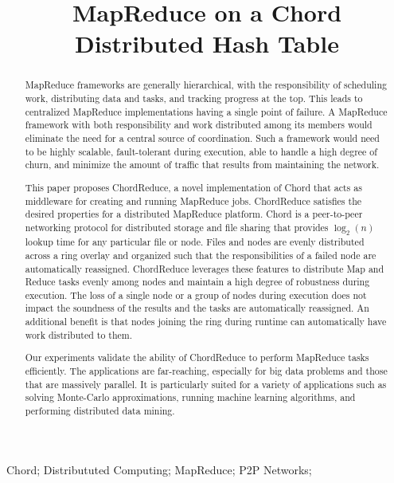 \documentclass[10pt, conference, compsocconf]{IEEEtran}
\title{MapReduce on a Chord Distributed Hash Table}
\author{\IEEEauthorblockN{Andrew Rosen \qquad Brendan Benshoof \qquad Matt Erwin \qquad Robert Harrison \qquad Anu Bourgeois}
\IEEEauthorblockA{Department of Computer Science\\
Georgia State University\\
Atlanta, Georgia\\
rosen@cs.gsu.edu}
}
\begin{document}
\maketitle

\begin{abstract}

MapReduce frameworks are generally hierarchical, with the responsibility of scheduling work, distributing data and tasks, and tracking progress at the top.  This leads to centralized MapReduce implementations having a single point of failure.  A MapReduce framework with both responsibility and work distributed among its members would eliminate the need for a central source of coordination.  Such a framework would need to be highly scalable, fault-tolerant during execution, able to handle a high degree of churn, and minimize the amount of traffic that results from maintaining the network. 

This paper proposes ChordReduce, a novel implementation of Chord that acts as middleware for creating and running MapReduce jobs. ChordReduce satisfies the desired properties for a distributed MapReduce platform. Chord is a peer-to-peer networking protocol for distributed storage and file sharing that provides $\log_{2}(n)$ lookup time for any particular file or node.  Files and nodes are evenly distributed across a ring overlay and organized such that the responsibilities of a failed node are automatically reassigned.  ChordReduce leverages these features to distribute Map and Reduce tasks evenly among nodes and maintain a high degree of robustness during execution.  The loss of a single node or a group of nodes during execution does not impact the soundness of the results and the tasks are automatically reassigned.  An additional benefit is that nodes joining the ring during runtime can automatically have work distributed to them.

Our experiments validate the ability of ChordReduce to perform MapReduce tasks efficiently. The applications are far-reaching, especially for big data problems and those that are massively parallel.  It is particularly suited for a variety of applications such as solving Monte-Carlo approximations, running machine learning algorithms, and performing distributed data mining. 


\end{abstract}


\begin{IEEEkeywords}
Chord; Distribututed Computing; MapReduce; P2P Networks;

\end{IEEEkeywords}
\end{document}
